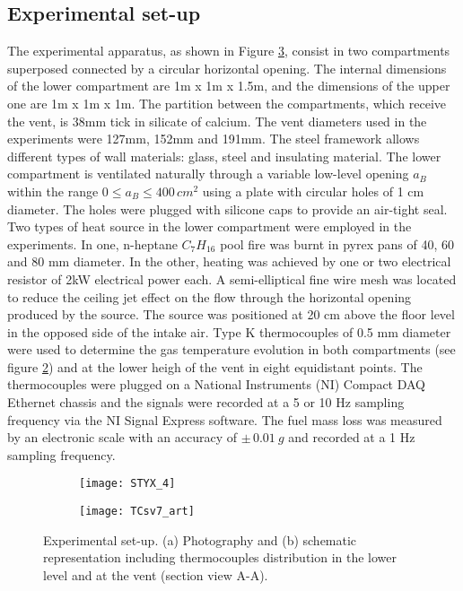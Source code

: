 \documentclass[preprint,12pt]{elsarticle}
\begin{document}
\subsection{Experimental set-up}
\label{sec:orgb91a930}
The experimental apparatus, as shown in Figure \ref{fig:set-up},
consist in two compartments superposed connected by a circular
horizontal opening. The internal dimensions of the lower compartment
are 1m x 1m x 1.5m, and the dimensions of the upper one are 1m x 1m x
1m. The partition between the compartments, which receive the vent, is
38mm tick in silicate of calcium. The vent diameters used in the
experiments were 127mm, 152mm and 191mm. The steel framework allows
different types of wall materials: glass, steel and insulating
material. The lower compartment is ventilated naturally through a
variable low-level opening \(a_B\) within the range \(0 \leqslant a_B
\leqslant 400\,\si{cm^2}\) using a plate with circular holes of 1 cm
diameter. The holes were plugged with silicone caps to provide an
air-tight seal. Two types of heat source in the lower compartment were
employed in the experiments. In one, n-heptane \(C_7H_{16}\) pool fire was
burnt in pyrex pans of 40, 60 and 80 mm diameter. In the other,
heating was achieved by one or two electrical resistor of 2kW
electrical power each. A semi-elliptical fine wire mesh was located to
reduce the ceiling jet effect on the flow through the horizontal
opening produced by the source. The source was positioned at 20 cm
above the floor level in the opposed side of the intake air. Type K
thermocouples of 0.5 mm diameter were used to determine the gas
temperature evolution in both compartments (see figure \ref{fig:TC})
and at the lower heigh of the vent in eight equidistant points. The
thermocouples were plugged on a National Instruments (NI) Compact DAQ
Ethernet chassis and the signals were recorded at a 5 or 10 Hz
sampling frequency via the NI Signal Express software. The fuel mass
loss was measured by an electronic scale with an accuracy of \(\pm\,\SI{0.01}{g}\) and recorded at a 1 Hz sampling frequency. 

\begin{figure}[h]
\centering
\begin{subfigure}[t]{0.5\textwidth}
  \centering
  \texttt{[image: STYX\_4]}
  \caption{}
  \label{photo_1}
\end{subfigure}
\begin{subfigure}[t]{0.48\textwidth}
  \centering
  \texttt{[image: TCsv7\_art]}
  \caption{}
  \label{fig:TC}
\end{subfigure}
\caption{Experimental set-up. (a) Photography and (b) schematic representation including thermocouples distribution in the lower level and at the vent (section view A-A).}
\label{fig:set-up}
\end{figure}
\end{document}
